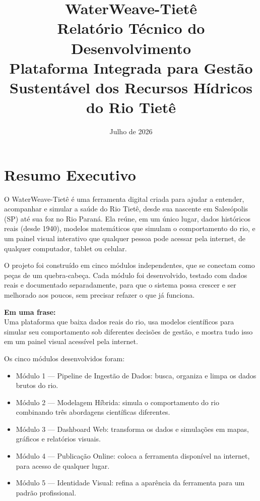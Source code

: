 \documentclass[11pt,a4paper]{article}
\title{\textbf{WaterWeave-Tietê}\\[0.3em]
\large Relatório Técnico do Desenvolvimento\\[0.3em]
\normalsize Plataforma Integrada para Gestão Sustentável dos Recursos Hídricos do Rio Tietê}
\author{}
\date{Julho de 2026}
\begin{document}
\maketitle
\thispagestyle{empty}
\clearpage

\tableofcontents
\clearpage


\section{Resumo Executivo}

O WaterWeave-Tietê é uma ferramenta digital criada para ajudar a entender, acompanhar e simular a saúde do Rio Tietê, desde sua nascente em Salesópolis (SP) até sua foz no Rio Paraná. Ela reúne, em um único lugar, dados históricos reais (desde 1940), modelos matemáticos que simulam o comportamento do rio, e um painel visual interativo que qualquer pessoa pode acessar pela internet, de qualquer computador, tablet ou celular.

O projeto foi construído em cinco módulos independentes, que se conectam como peças de um quebra-cabeça. Cada módulo foi desenvolvido, testado com dados reais e documentado separadamente, para que o sistema possa crescer e ser melhorado aos poucos, sem precisar refazer o que já funciona.

\begin{calloutbox}
\textbf{Em uma frase:}\\
Uma plataforma que baixa dados reais do rio, usa modelos científicos para simular seu comportamento sob diferentes decisões de gestão, e mostra tudo isso em um painel visual acessível pela internet.
\end{calloutbox}

Os cinco módulos desenvolvidos foram:

\begin{itemize}
\item Módulo 1 — Pipeline de Ingestão de Dados: busca, organiza e limpa os dados brutos do rio.
\item Módulo 2 — Modelagem Híbrida: simula o comportamento do rio combinando três abordagens científicas diferentes.
\item Módulo 3 — Dashboard Web: transforma os dados e simulações em mapas, gráficos e relatórios visuais.
\item Módulo 4 — Publicação Online: coloca a ferramenta disponível na internet, para acesso de qualquer lugar.
\item Módulo 5 — Identidade Visual: refina a aparência da ferramenta para um padrão profissional.
\end{itemize}
\end{document}
